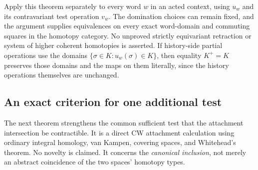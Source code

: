 \documentclass[11pt]{article}
\theoremstyle{definition}
\begin{document}
Apply this theorem separately to every word $w$ in an acted context,
using $u_w$ and its contravariant test operation $v_w$. The domination
choices can remain fixed, and the argument supplies equivalences on
every exact word-domain and commuting squares in the homotopy
category. No unproved strictly equivariant retraction or system of
higher coherent homotopies is asserted. If history-side partial
operations use the domains $\{\sigma\in K:u_w(\sigma)\in K\}$,
then equality $K^+=K$ preserves those domains and the maps on them
literally, since the history operations themselves are unchanged.


\subsection{An exact criterion for one additional test}

The next theorem strengthens the common sufficient test that the
attachment intersection be contractible. It is a direct CW attachment
calculation using ordinary integral homology, van Kampen, covering spaces,
and Whitehead's theorem. No novelty is claimed. It concerns the
\emph{canonical inclusion}, not merely an abstract coincidence of the
two spaces' homotopy types.
\end{document}
